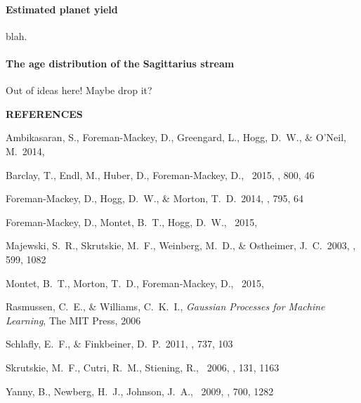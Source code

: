\documentclass[letterpaper,12pt,preprint]{hack_aastex}
\begin{document}
\paragraph{Estimated planet yield} blah.

\paragraph{The age distribution of the Sagittarius stream}

Out of ideas here! Maybe drop it?



\begin{multicols}{2}
{\centering\bf REFERENCES\par}
\vspace{0.2em}
\begin{thebibliography}{}%
\raggedright\raggedbottom\scriptsize\setlength{\parskip}{-0.5em}%

Ambikasaran, S., Foreman-Mackey, D., Greengard, L., Hogg, D.~W.,
\& O'Neil, M.\ 2014, 

Barclay, T., Endl, M., Huber, D., Foreman-Mackey, D., \etal\ 2015, \apj, 800,
46

Foreman-Mackey, D., Hogg, D.~W., \& Morton, T.~D.\ 2014, \apj, 795, 64

Foreman-Mackey, D., Montet, B.~T., Hogg, D.~W., \etal\ 2015, 

Majewski, S.~R., Skrutskie, M.~F., Weinberg, M.~D., \& Ostheimer, J.~C.\ 2003,
\apj, 599, 1082

Montet, B.~T., Morton, T.~D., Foreman-Mackey, D., \etal\ 2015,

Rasmussen, C.~E., \& Williams, C.~K.~I., \emph{Gaussian Processes for Machine
Learning}, The MIT Press, 2006

Schlafly, E.~F., \& Finkbeiner, D.~P.\ 2011, \apj, 737, 103

Skrutskie, M.~F., Cutri, R.~M., Stiening, R., \etal\ 2006, \aj, 131, 1163

Yanny, B., Newberg, H.~J., Johnson, J.~A., \etal\ 2009, \apj, 700, 1282

\end{thebibliography}
\end{multicols}
\end{document}
